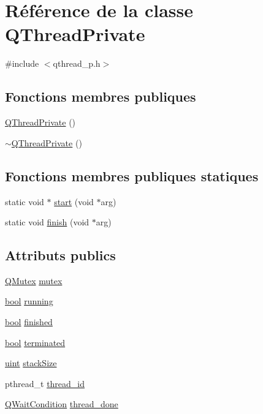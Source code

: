 \hypertarget{class_q_thread_private}{}\section{Référence de la classe Q\+Thread\+Private}
\label{class_q_thread_private}


{\ttfamily \#include $<$qthread\+\_\+p.\+h$>$}

\subsection*{Fonctions membres publiques}
\begin{DoxyCompactItemize}
\item 
\hyperlink{class_q_thread_private_abdb1a4d74130cecab144c99ade69bfea}{Q\+Thread\+Private} ()
\item 
\hyperlink{class_q_thread_private_abb5f5ad64cf3e6ca632c5e3eacb382f0}{$\sim$\+Q\+Thread\+Private} ()
\end{DoxyCompactItemize}
\subsection*{Fonctions membres publiques statiques}
\begin{DoxyCompactItemize}
\item 
static void $\ast$ \hyperlink{class_q_thread_private_ab7ed40bba5929f954506e78cd1107949}{start} (void $\ast$arg)
\item 
static void \hyperlink{class_q_thread_private_a9352e719b7ffaebe586caffac7df2ce5}{finish} (void $\ast$arg)
\end{DoxyCompactItemize}
\subsection*{Attributs publics}
\begin{DoxyCompactItemize}
\item 
\hyperlink{class_q_mutex}{Q\+Mutex} \hyperlink{class_q_thread_private_a7eda287dec112d2d5ae6e3ab1f1e87a7}{mutex}
\item 
\hyperlink{qglobal_8h_a1062901a7428fdd9c7f180f5e01ea056}{bool} \hyperlink{class_q_thread_private_ac96f01bd5deeef951778d772aaa07809}{running}
\item 
\hyperlink{qglobal_8h_a1062901a7428fdd9c7f180f5e01ea056}{bool} \hyperlink{class_q_thread_private_aafd7888a95ed3d66521d36e703fbd417}{finished}
\item 
\hyperlink{qglobal_8h_a1062901a7428fdd9c7f180f5e01ea056}{bool} \hyperlink{class_q_thread_private_af4814bc64bcadcaf0c148a0c0e5923f8}{terminated}
\item 
\hyperlink{qglobal_8h_a4d3943ddea65db7163a58e6c7e8df95a}{uint} \hyperlink{class_q_thread_private_a7a278caba71183f61e4a11c3d0e89a12}{stack\+Size}
\item 
pthread\+\_\+t \hyperlink{class_q_thread_private_a149ec58cdf120de1c55fdccd0e108325}{thread\+\_\+id}
\item 
\hyperlink{class_q_wait_condition}{Q\+Wait\+Condition} \hyperlink{class_q_thread_private_a812ec2aaef47ea81521066b641f9ae05}{thread\+\_\+done}
\end{DoxyCompactItemize}


